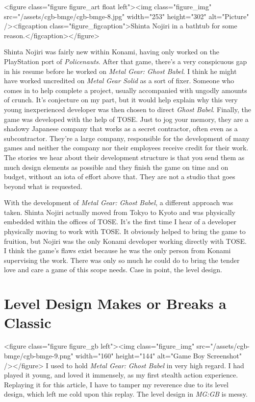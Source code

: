 \documentclass{book}
\begin{document}
<figure class="figure figure_art float left"><img class="figure_img" src="/assets/cgb-bmge/cgb-bmge-8.jpg" width="253" height="302" alt="Picture" /><figcaption class="figure_figcaption">Shinta Nojiri in a bathtub for some reason.</figcaption></figure>

Shinta Nojiri was fairly new within Konami, having only worked on the PlayStation port of \emph{Policenauts}. After that game, there’s a very conspicuous gap in his resume before he worked on \emph{Metal Gear: Ghost Babel}. I think he might have worked uncredited on \emph{Metal Gear Solid} as a sort of fixer. Someone who comes in to help complete a project, usually accompanied with ungodly amounts of crunch. It’s conjecture on my part, but it would help explain why this very young inexperienced developer was then chosen to direct \emph{Ghost Babel}. Finally, the game was developed with the help of TOSE. Just to jog your memory, they are a shadowy Japanese company that works as a secret contractor, often even as a subcontractor. They’re a large company, responsible for the development of many games and neither the company nor their employees receive credit for their work. The stories we hear about their development structure is that you send them as much design elements as possible and they finish the game on time and on budget, without an iota of effort above that. They are not a studio that goes beyond what is requested.

With the development of \emph{Metal Gear: Ghost Babel}, a different approach was taken. Shinta Nojiri actually moved from Tokyo to Kyoto and was physically embedded within the offices of TOSE. It’s the first time I hear of a developer physically moving to work with TOSE. It obviously helped to bring the game to fruition, but Nojiri was the only Konami developer working directly with TOSE. I think the game’s flaws exist because he was the only person from Konami supervising the work. There was only so much he could do to bring the tender love and care a game of this scope needs. Case in point, the level design.

\FloatBarrier\needspace{10mm}\section*{Level Design Makes or Breaks a Classic}\nopagebreak[4]

<figure class="figure figure_gb left"><img class="figure_img" src="/assets/cgb-bmge/cgb-bmge-9.png" width="160" height="144" alt="Game Boy Screenshot" /></figure>
I used to hold \emph{Metal Gear: Ghost Babel} in very high regard. I had played it young, and loved it immensely, as my first stealth action experience. Replaying it for this article, I have to tamper my reverence due to its level design, which left me cold upon this replay. The level design in \emph{MG:GB} is messy.
\end{document}
